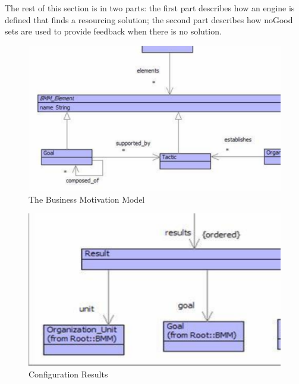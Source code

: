 The rest of this section is in two parts: the first part describes
how an engine is defined that finds a resourcing solution; the second
part describes how noGood sets are used to provide feedback when there
is no solution.

%
\begin{figure}
\begin{center}

\includegraphics[width=12cm]{LanguageEngineering/Choice/Images/BMMModel}

\caption{The Business Motivation Model \label{fig:The-Business-Motivation}}

\end{center}
\end{figure}


%
\begin{figure}
\begin{center}

\includegraphics[width=12cm]{LanguageEngineering/Choice/Images/Results}

\caption{Configuration Results\label{fig:Configuration-Results}}

\end{center}
\end{figure}


